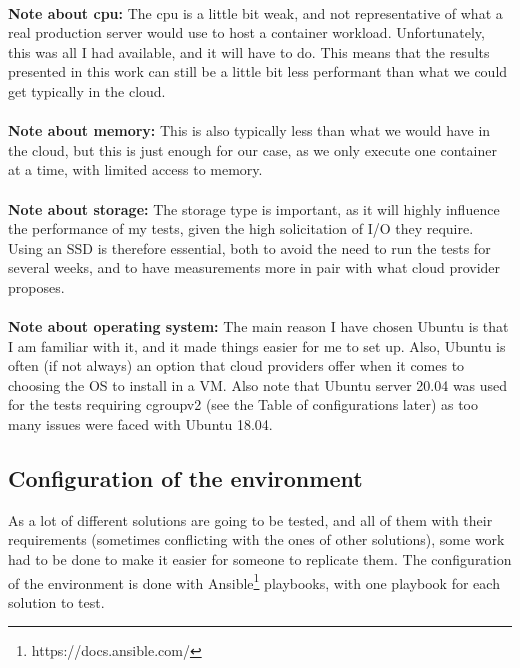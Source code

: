 \paragraph{}\textbf{Note about cpu:}  The cpu is a little bit weak, and not representative of what a real production server would use to host a container workload.  Unfortunately, this was all I had available, and it will have to do.  This means that the results presented in this work can still be a little bit less performant than what we could get typically in the cloud.
\paragraph{}\textbf{Note about memory:}  This is also typically less than what we would have in the cloud, but this is just enough for our case, as we only execute one container at a time, with limited access to memory.
\paragraph{}\textbf{Note about storage:}  The storage type is important, as it will highly influence the performance of my tests, given the high solicitation of I/O they require.  Using an SSD is therefore essential, both to avoid the need to run the tests for several weeks, and to have measurements more in pair with what cloud provider proposes.
\paragraph{}\textbf{Note about operating system:}  The main reason I have chosen Ubuntu is that I am familiar with it, and it made things easier for me to set up.  Also, Ubuntu is often (if not always) an option that cloud providers offer when it comes to choosing the OS to install in a VM.  Also note that Ubuntu server 20.04 was used for the tests requiring cgroupv2 (see the Table of configurations later) as too many issues were faced with Ubuntu 18.04.

\subsection{Configuration of the environment}
As a lot of different solutions are going to be tested, and all of them with their requirements (sometimes conflicting with the ones of other solutions), some work had to be done to make it easier for someone to replicate them.  The configuration of the environment is done with Ansible\footnote{https://docs.ansible.com/} playbooks, with one playbook for each solution to test.

